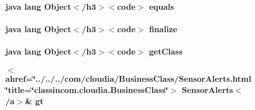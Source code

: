 \hypertarget{_database_2_fetch_sensor_alerts_8html_a8974318cea585f72df717e0380ec7104}{
\subsubsection[{equals}]{\setlength{\rightskip}{0pt plus 5cm}java lang Object$<$/h3$>$$<$code$>$ equals}}\label{_database_2_fetch_sensor_alerts_8html_a8974318cea585f72df717e0380ec7104}
\hypertarget{_database_2_fetch_sensor_alerts_8html_ab2315181ead4aeedef2374039b6ddde7}{
\subsubsection[{finalize}]{\setlength{\rightskip}{0pt plus 5cm}java lang Object$<$/h3$>$$<$code$>$ finalize}}\label{_database_2_fetch_sensor_alerts_8html_ab2315181ead4aeedef2374039b6ddde7}
\hypertarget{_database_2_fetch_sensor_alerts_8html_a98e6644727fe65eac217a6855045be43}{
\subsubsection[{get\-Class}]{\setlength{\rightskip}{0pt plus 5cm}java lang Object$<$/h3$>$$<$code$>$ get\-Class}}\label{_database_2_fetch_sensor_alerts_8html_a98e6644727fe65eac217a6855045be43}
\hypertarget{_database_2_fetch_sensor_alerts_8html_ae5d6fbc28ae374bf3f5b61ed6936512d}{
\subsubsection[{gt}]{\setlength{\rightskip}{0pt plus 5cm}$<$ahref=\char`\"{}../../../com/cloudia/Business\-Class/Sensor\-Alerts.\-html\char`\"{}title=\char`\"{}classincom.\-cloudia.\-Business\-Class\char`\"{}$>$ Sensor\-Alerts$<$/{\bf a}$>$\& gt}}\label{_database_2_fetch_sensor_alerts_8html_ae5d6fbc28ae374bf3f5b61ed6936512d}
